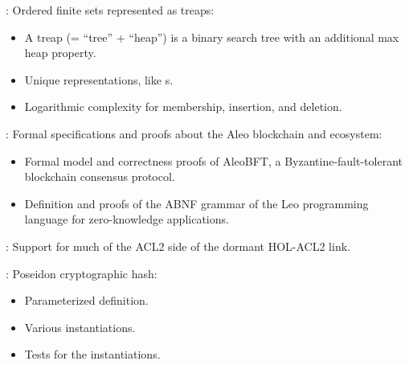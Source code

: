 \begin{frame}

\newlibtitle

:
Ordered finite sets represented as treaps:
\begin{itemize}
\item A treap (= ``tree'' + ``heap'') is a binary search tree with an
      additional max heap property.
\item Unique representations, like s.
\item Logarithmic complexity for membership, insertion, and deletion.
\end{itemize}

\end{frame}


\begin{frame}

\newlibtitle

:
Formal specifications and proofs about the Aleo blockchain and ecosystem:
\begin{itemize}
\item Formal model and correctness proofs of AleoBFT,
      a Byzantine-fault-tolerant blockchain consensus protocol.
\item Definition and proofs of the ABNF grammar of
      the Leo programming language for zero-knowledge applications.
\end{itemize}

\end{frame}


\begin{frame}

\newlibtitle

:
Support for much of the ACL2 side of the dormant HOL-ACL2 link.

\end{frame}


\begin{frame}

\newlibtitle

:
Poseidon cryptographic hash:
\begin{itemize}
\item Parameterized definition.
\item Various instantiations.
\item Tests for the instantiations.
\end{itemize}

\end{frame}


